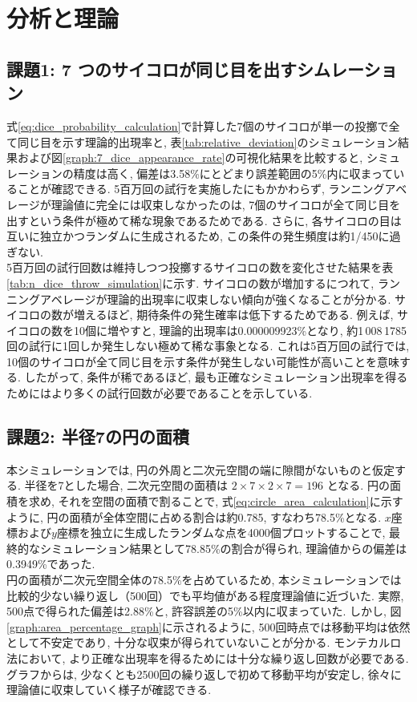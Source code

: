 \documentclass[a4j, 12pt ]{jarticle}
\begin{document}
\section{分析と理論}
\subsection{課題1: 7 つのサイコロが同じ目を出すシムレーション}
式\ref{eq:dice_probability_calculation}で計算した7個のサイコロが単一の投擲で全て同じ目を示す理論的出現率と, 表\ref{tab:relative_deviation}のシミュレーション結果および図\ref{graph:7_dice_appearance_rate}の可視化結果を比較すると, シミュレーションの精度は高く, 偏差は3.58\%にとどまり誤差範囲の5\%内に収まっていることが確認できる. 5百万回の試行を実施したにもかかわらず, ランニングアベレージが理論値に完全には収束しなかったのは, 7個のサイコロが全て同じ目を出すという条件が極めて稀な現象であるためである. さらに, 各サイコロの目は互いに独立かつランダムに生成されるため, この条件の発生頻度は約1/450に過ぎない.\\

5百万回の試行回数は維持しつつ投擲するサイコロの数を変化させた結果を表\ref{tab:n_dice_throw_simulation}に示す. サイコロの数が増加するにつれて, ランニングアベレージが理論的出現率に収束しない傾向が強くなることが分かる. サイコロの数が増えるほど, 期待条件の発生確率は低下するためである. 例えば, サイコロの数を10個に増やすと, 理論的出現率は0.000009923\%となり, 約1\,008\,1785回の試行に1回しか発生しない極めて稀な事象となる. これは5百万回の試行では, 10個のサイコロが全て同じ目を示す条件が発生しない可能性が高いことを意味する. したがって, 条件が稀であるほど, 最も正確なシミュレーション出現率を得るためにはより多くの試行回数が必要であることを示している.\\

\subsection{課題2: 半径7の円の面積}
本シミュレーションでは, 円の外周と二次元空間の端に隙間がないものと仮定する. 半径を7とした場合, 二次元空間の面積は $2 \times 7 \times 2 \times 7 = 196$ となる. 円の面積を求め, それを空間の面積で割ることで, 式\ref{eq:circle_area_calculation}に示すように, 円の面積が全体空間に占める割合は約0.785, すなわち78.5\%となる. $x$座標および$y$座標を独立に生成したランダムな点を4000個プロットすることで, 最終的なシミュレーション結果として78.85\%の割合が得られ, 理論値からの偏差は0.3949\%であった.\\

円の面積が二次元空間全体の78.5\%を占めているため, 本シミュレーションでは比較的少ない繰り返し（500回）でも平均値がある程度理論値に近づいた. 実際, 500点で得られた偏差は2.88\%と, 許容誤差の5\%以内に収まっていた. しかし, 図\ref{graph:area_percentage_graph}に示されるように, 500回時点では移動平均は依然として不安定であり, 十分な収束が得られていないことが分かる. モンテカルロ法において, より正確な出現率を得るためには十分な繰り返し回数が必要である. グラフからは, 少なくとも2500回の繰り返しで初めて移動平均が安定し, 徐々に理論値に収束していく様子が確認できる.\\
\end{document}

